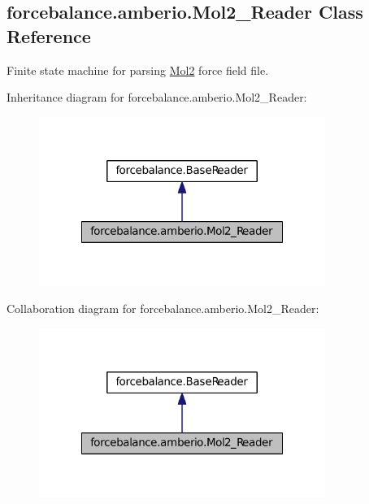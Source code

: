 \hypertarget{classforcebalance_1_1amberio_1_1Mol2__Reader}{\subsection{forcebalance.\-amberio.\-Mol2\-\_\-\-Reader \-Class \-Reference}
\label{classforcebalance_1_1amberio_1_1Mol2__Reader}
}


\-Finite state machine for parsing \hyperlink{namespaceforcebalance_1_1Mol2}{\-Mol2} force field file.  




\-Inheritance diagram for forcebalance.\-amberio.\-Mol2\-\_\-\-Reader\-:
\nopagebreak
\begin{figure}[H]
\begin{center}
\leavevmode
\includegraphics[width=264pt]{classforcebalance_1_1amberio_1_1Mol2__Reader__inherit__graph}
\end{center}
\end{figure}


\-Collaboration diagram for forcebalance.\-amberio.\-Mol2\-\_\-\-Reader\-:
\nopagebreak
\begin{figure}[H]
\begin{center}
\leavevmode
\includegraphics[width=264pt]{classforcebalance_1_1amberio_1_1Mol2__Reader__coll__graph}
\end{center}
\end{figure}
